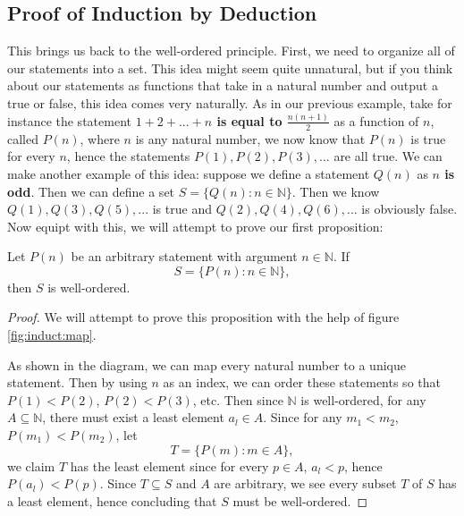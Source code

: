 \documentclass[11pt]{article}
\numberwithin{lemma}{section}
\numberwithin{equation}{section}
\numberwithin{define}{section}
\numberwithin{prop}{section}
\numberwithin{figure}{section}
\numberwithin{theorem}{section}
\newcounter{ex}[section]
\numberwithin{ex}{section}
\def\nat{\mathbb{N}}
\begin{document}
\subsection{Proof of Induction by Deduction}
This brings us back to the well-ordered principle. First, we need to organize all of our statements into a set. This idea might seem quite unnatural, but if you think about our statements as functions that take in a natural number and output a true or false, this idea comes very naturally. 
As in our previous example, take for instance the statement \textbf{$1+2+...+n$ is equal to $\frac{n(n+1)}{2}$} as a function of $n$, called $P(n)$, where $n$ is any natural number, we now know that $P(n)$ is true for every $n$, hence the statements $P(1),P(2),P(3),...$ are all true. 
We can make another example of this idea: suppose we define a statement $Q(n)$ as \textbf{$n$ is odd}. Then we can define a set $S=\{Q(n):n\in\nat\}$. Then we know $Q(1),Q(3),Q(5),...$ is true and $Q(2),Q(4),Q(6),...$ is obviously false. Now equipt with this, we will attempt to prove our first proposition:
\begin{prop}
\label{prop:well-order}
	Let $P(n)$ be an arbitrary statement with argument $n\in\nat$. If
	$$S=\{P(n):n\in\nat\},$$
	then $S$ is well-ordered.
\end{prop}
\begin{proof}
	We will attempt to prove this proposition with the help of figure \eqref{fig:induct:map}.
	\begin{figure}[h]
	\centering
		\caption{}
		\label{fig:induct:map}
	\end{figure}
	As shown in the diagram, we can map every natural number to a unique statement. Then by using $n$ as an index, we can order these statements so that $P(1)<P(2)$, $P(2)<P(3)$, etc. Then since $\nat$ is well-ordered, for any $A\subseteq \nat$, there must exist a least element $a_l\in A$. Since for any $m_1<m_2$, $P(m_1)<P(m_2)$, let 
	$$T=\{P(m):m\in A\},$$
	we claim $T$ has the least element since for every $p\in A$, $a_l<p$, hence $P(a_l)<P(p)$. Since $T\subseteq S$ and $A$ are arbitrary, we see every subset $T$ of $S$ has a least element, hence concluding that $S$ must be well-ordered. 
\end{proof}
\end{document}
